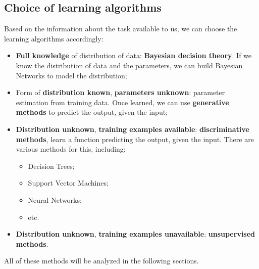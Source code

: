 \subsection{Choice of learning algorithms}
Based on the information about the task available to us, we can choose the learning algorithms accordingly:
\begin{itemize}
    \item \textbf{Full knowledge} of distribution of data: \textbf{Bayesian decision theory}. 
    If we know the distribution of data and the parameters, we can build Bayesian Networks to model the distribution;
    \item Form of \textbf{distribution known}, \textbf{parameters unknown}: parameter estimation from training data. 
    Once learned, we can use \textbf{generative methods} to predict the output, given the input;
    \item \textbf{Distribution unknown}, \textbf{training examples available}: \textbf{discriminative methods}, learn a function 
    predicting the output, given the input. There are various methods for this, including:
    \begin{itemize}
        \item Decision Trees;
        \item Support Vector Machines;
        \item Neural Networks;
        \item etc.
    \end{itemize}
    \item \textbf{Distribution unknown}, \textbf{training examples unavailable}: \textbf{unsupervised methods}.
\end{itemize}
All of these methods will be analyzed in the following sections.
